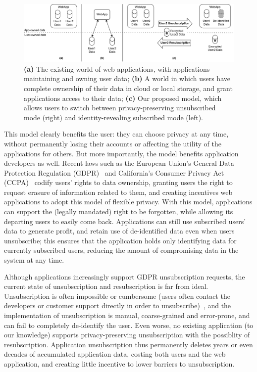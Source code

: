\begin{figure}[ht!]
    \centering
    \includegraphics[width=\textwidth]{img/worlds}

    \caption{\textbf{(a)} The existing world of web applications, with applications maintaining and
    owning user data; \textbf{(b)} A world in which users have complete ownership of their data in cloud or local
    storage, and grant applications access to their data;
    \textbf{(c)} Our proposed model, which allows users to switch between privacy-preserving unsubscribed
    mode (right) and identity-revealing subscribed mode (left).}
    \label{fig:world}
\end{figure}

This model clearly benefits the user: they can choose privacy at any time, without permanently
losing their accounts or affecting the utility of the applications for others.  But more
importantly, the model benefits application developers as well. Recent laws such as the European
Union's General Data Protection Regulation (GDPR)~\cite{eu:gdpr} and California's Consumer Privacy
Act (CCPA)~\cite{ca:privacy-act} codify users' rights to data ownership, granting users the right to
request erasure of information related to them, and creating incentives web applications to adopt
this model of flexible privacy. With this model, applications can support the (legally mandated)
right to be forgotten, while allowing its departing users to easily come back. Applications can
still use subscribed users' data to generate profit, and retain use of de-identified data even when
users unsubscribe; this ensures that the application holds only identifying data for currently subscribed users,
reducing the amount of compromising data in the system at any time.

Although applications increasingly support GDPR unsubscription requests, the current state of
unsubscription and resubscription is far from ideal. Unsubscription is often impossible or
cumbersome (users often contact the developers or customer support directly in order to
unsubscribe)~\cite{jdm}, and the implementation of unsubscription is manual, coarse-grained and
error-prone, and can fail to completely de-identify the user.  Even worse, no existing application
(to our knowledge) supports privacy-preserving unsubscription with the possiblity of resubscription.
Application unsubscription thus permanently deletes years or even decades of accumulated application
data, costing both users and the web application, and creating little incentive to lower barriers to
unsubscription. 

